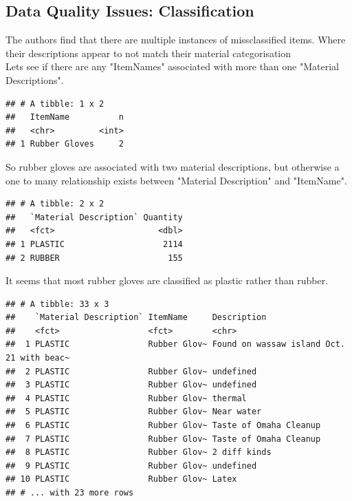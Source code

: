 \documentclass[10pt]{article}\usepackage[]{graphicx}\usepackage[]{color}
\makeatletter
\newenvironment{kframe}{%
 \def\at@end@of@kframe{}%
 \ifinner\ifhmode%
  \def\at@end@of@kframe{\end{minipage}}%
  \begin{minipage}{\columnwidth}%
 \fi\fi%
 \def\FrameCommand##1{\hskip\@totalleftmargin \hskip-\fboxsep
 \colorbox{shadecolor}{##1}\hskip-\fboxsep
     \hskip-\linewidth \hskip-\@totalleftmargin \hskip\columnwidth}%
 \MakeFramed {\advance\hsize-\width
   \@totalleftmargin\z@ \linewidth\hsize
   \@setminipage}}%
 {\par\unskip\endMakeFramed%
 \at@end@of@kframe}
\newenvironment{knitrout}{}{} %
\makeatother
\begin{document}
\subsection{Data Quality Issues: Classification}
The authors find that there are multiple instances of missclassified items. Where their descriptions appear to not match their material categorisation\\
Lets see if there are any "ItemNames" associated with more than one "Material Descriptions".
\begin{knitrout}\small
{}\color{fgcolor}\begin{kframe}
\begin{verbatim}
## # A tibble: 1 x 2
##   ItemName          n
##   <chr>         <int>
## 1 Rubber Gloves     2
\end{verbatim}
\end{kframe}
\end{knitrout}
So rubber gloves are associated with two material descriptions, but otherwise a one to many relationship exists between "Material Description" and "ItemName".
\begin{knitrout}\small
{}\color{fgcolor}\begin{kframe}
\begin{verbatim}
## # A tibble: 2 x 2
##   `Material Description` Quantity
##   <fct>                     <dbl>
## 1 PLASTIC                    2114
## 2 RUBBER                      155
\end{verbatim}
\end{kframe}
\end{knitrout}
It seems that most rubber gloves are classified as plastic rather than rubber.
\begin{knitrout}\small
{}\color{fgcolor}\begin{kframe}
\begin{verbatim}
## # A tibble: 33 x 3
##    `Material Description` ItemName     Description                              
##    <fct>                  <fct>        <chr>                                    
##  1 PLASTIC                Rubber Glov~ Found on wassaw island Oct. 21 with beac~
##  2 PLASTIC                Rubber Glov~ undefined                                
##  3 PLASTIC                Rubber Glov~ undefined                                
##  4 PLASTIC                Rubber Glov~ thermal                                  
##  5 PLASTIC                Rubber Glov~ Near water                               
##  6 PLASTIC                Rubber Glov~ Taste of Omaha Cleanup                   
##  7 PLASTIC                Rubber Glov~ Taste of Omaha Cleanup                   
##  8 PLASTIC                Rubber Glov~ 2 diff kinds                             
##  9 PLASTIC                Rubber Glov~ undefined                                
## 10 PLASTIC                Rubber Glov~ Latex                                    
## # ... with 23 more rows
\end{verbatim}
\end{kframe}
\end{knitrout}
\end{document}
